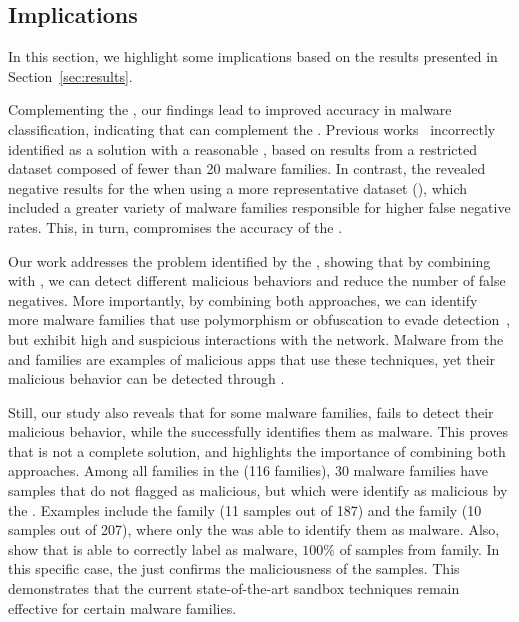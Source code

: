\subsection{Implications}\label{sec:implications}

In this section, we highlight some implications based on the results presented in Section~\ref{sec:results}.

Complementing the \fhc, our findings lead to improved accuracy in malware classification, indicating that \net can complement the \mas. Previous works~\cite{DBLP:conf/wcre/BaoLL18,DBLP:conf/iceccs/LeB0GL18,DBLP:journals/jss/CostaMMSSBNR22} incorrectly identified \mas as a solution with a reasonable \fone, based on results from a restricted dataset composed of fewer than 20 malware families. In contrast, the \fhc revealed negative results for the \mas when using a more representative dataset (\cds), which included a greater variety of malware families responsible for higher false negative rates. This, in turn, compromises the accuracy of the \mas.


Our work addresses the problem identified by the \fhc, showing that by combining \mas with \net, we can detect different malicious behaviors and reduce the number of false negatives. More importantly, by combining both approaches, we can identify more malware families that use polymorphism or obfuscation to evade detection~\cite{DBLP:conf/acsac/MoserKK07}, but exhibit high and suspicious interactions with the network. Malware from the \gps and \tjk families are examples of malicious apps that use these techniques, yet their malicious behavior can be detected through \net.

Still, our study also reveals that for some malware families, \net fails to detect their malicious behavior, while the \mas successfully identifies them as malware. This proves that \net is not a complete solution, and highlights the importance of combining both approaches. Among all families in the \cds 
 (116 families), 30 malware families have samples that \net do not flagged as malicious, but which were identify as malicious by the \mas. Examples include the  family (11 samples out of 187) and the  family (10 samples out of 207), where only the \mas was able to identify them as malware. Also, \fhc show that \mas is able to correctly label as malware, $100\%$ of samples from  family. In this specific case, the \net just confirms the maliciousness of the samples. This demonstrates that the current state-of-the-art sandbox techniques remain effective for certain malware families.

